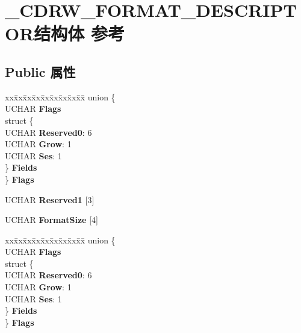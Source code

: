 \hypertarget{struct___c_d_r_w___f_o_r_m_a_t___d_e_s_c_r_i_p_t_o_r}{}\section{\+\_\+\+C\+D\+R\+W\+\_\+\+F\+O\+R\+M\+A\+T\+\_\+\+D\+E\+S\+C\+R\+I\+P\+T\+O\+R结构体 参考}
\label{struct___c_d_r_w___f_o_r_m_a_t___d_e_s_c_r_i_p_t_o_r}
\subsection*{Public 属性}
\begin{DoxyCompactItemize}
\item 
\mbox{\label{struct___c_d_r_w___f_o_r_m_a_t___d_e_s_c_r_i_p_t_o_r_a0a08b9b8bfd660869837c3f72a3957ac}} 
\begin{tabbing}
xx\=xx\=xx\=xx\=xx\=xx\=xx\=xx\=xx\=\kill
union \{\\
\>UCHAR {\bfseries Flags}\\
\>struct \{\\
\>\>UCHAR {\bfseries Reserved0}: 6\\
\>\>UCHAR {\bfseries Grow}: 1\\
\>\>UCHAR {\bfseries Ses}: 1\\
\>\} {\bfseries Fields}\\
\} {\bfseries Flags}\\

\end{tabbing}\item 
\mbox{\label{struct___c_d_r_w___f_o_r_m_a_t___d_e_s_c_r_i_p_t_o_r_abcb2dcd1e4896c1939565cd0d68b4a66}} 
U\+C\+H\+AR {\bfseries Reserved1} \mbox{[}3\mbox{]}
\item 
\mbox{\label{struct___c_d_r_w___f_o_r_m_a_t___d_e_s_c_r_i_p_t_o_r_a09b4f904f94b87c52f87fc8f28489855}} 
U\+C\+H\+AR {\bfseries Format\+Size} \mbox{[}4\mbox{]}
\item 
\mbox{\label{struct___c_d_r_w___f_o_r_m_a_t___d_e_s_c_r_i_p_t_o_r_afef7bc9805b2a6eca775332ef6ba5ab7}} 
\begin{tabbing}
xx\=xx\=xx\=xx\=xx\=xx\=xx\=xx\=xx\=\kill
union \{\\
\>UCHAR {\bfseries Flags}\\
\>struct \{\\
\>\>UCHAR {\bfseries Reserved0}: 6\\
\>\>UCHAR {\bfseries Grow}: 1\\
\>\>UCHAR {\bfseries Ses}: 1\\
\>\} {\bfseries Fields}\\
\} {\bfseries Flags}\\


\end{tabbing}
\end{DoxyCompactItemize}
